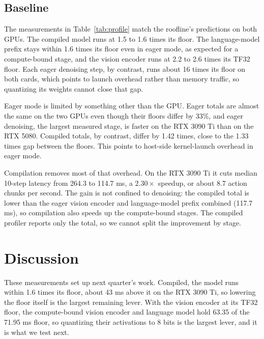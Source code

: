 \documentclass[12pt,letterpaper]{article}
\begin{document}
\subsection{Baseline}
\begin{table}[!h]

\caption{Measured median latency in ms against the floor, for the workload in Methods. Stage rows come from eager 10-step inference. Ratio is measured latency divided by the floor; closer to 1 means closer to the hardware limit. Produced by \texttt{uv run python -m piquant.profile}.}
\label{tab:profile}
\end{table}

The measurements in Table~\ref{tab:profile} match the roofline's predictions on both GPUs. The compiled model runs at 1.5 to 1.6 times its floor. The language-model prefix stays within 1.6 times its floor even in eager mode, as expected for a compute-bound stage, and the vision encoder runs at 2.2 to 2.6 times its TF32 floor. Each eager denoising step, by contrast, runs about 16 times its floor on both cards, which points to launch overhead rather than memory traffic, so quantizing its weights cannot close that gap.

Eager mode is limited by something other than the GPU. Eager totals are almost the same on the two GPUs even though their floors differ by 33\%, and eager denoising, the largest measured stage, is faster on the RTX 3090 Ti than on the RTX 5080. Compiled totals, by contrast, differ by 1.42 times, close to the 1.33 times gap between the floors. This points to host-side kernel-launch overhead in eager mode.

Compilation removes most of that overhead. On the RTX 3090 Ti it cuts median 10-step latency from 264.3 to 114.7 ms, a $2.30\times$ speedup, or about 8.7 action chunks per second. The gain is not confined to denoising: the compiled total is lower than the eager vision encoder and language-model prefix combined (117.7 ms), so compilation also speeds up the compute-bound stages. The compiled profiler reports only the total, so we cannot split the improvement by stage.

\section{Discussion}

These measurements set up next quarter's work. Compiled, the model runs within 1.6 times its floor, about 43 ms above it on the RTX 3090 Ti, so lowering the floor itself is the largest remaining lever. With the vision encoder at its TF32 floor, the compute-bound vision encoder and language model hold 63.35 of the 71.95 ms floor, so quantizing their activations to 8 bits is the largest lever, and it is what we test next.
\end{document}
